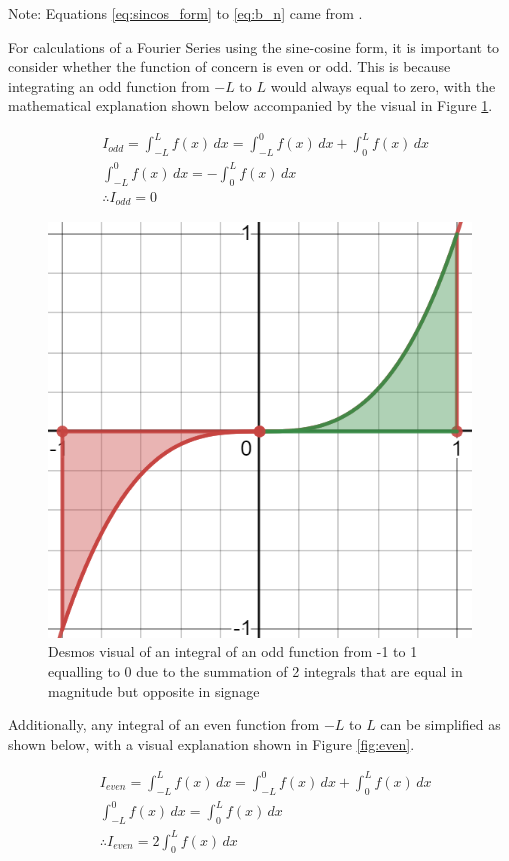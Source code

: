 \documentclass[letterpaper, 12pt]{article}
\begin{document}
Note: Equations \ref*{eq:sincos_form} to \ref*{eq:b_n} came from \cite{tisdellHowComputeFourier2009}.

For calculations of a Fourier Series using the sine-cosine form,
it is important to consider whether the function of concern
is even or odd. This is because integrating an odd function
from \(-L\) to \(L\) would always equal to zero,
with the mathematical explanation shown below
accompanied by the visual in Figure \ref*{fig:odd}.

\begin{align*}
     & I_{odd} = \int_{-L}^{L} f(x) \,dx = \int_{-L}^{0} f(x) \,dx + \int_{0}^{L} f(x) \,dx
    \\
     & \int_{-L}^{0} f(x) \,dx = -\int_{0}^{L} f(x) \,dx
    \\
     & \therefore I_{odd} = 0
\end{align*}

\begin{figure}[H]
    \centering
    \includegraphics[width=.6\textwidth]{odd.png}
    \caption{Desmos visual of an integral of an odd function from -1 to 1 equalling to 0 due to the summation of 2 integrals that are equal in magnitude but opposite in signage \protect\cite{DesmosGraphingCalculator}}
    \label{fig:odd}
\end{figure}

Additionally, any integral of an even function from \(-L\) to \(L\) can be simplified
as shown below, with a visual explanation shown in Figure \ref*{fig:even}.

\begin{align*}
     & I_{even} = \int_{-L}^{L} f(x) \,dx = \int_{-L}^{0} f(x) \,dx + \int_{0}^{L} f(x) \,dx
    \\
     & \int_{-L}^{0} f(x) \,dx = \int_{0}^{L} f(x) \,dx
    \\
     & \therefore I_{even} = 2\int_{0}^{L} f(x) \,dx
\end{align*}
\end{document}
